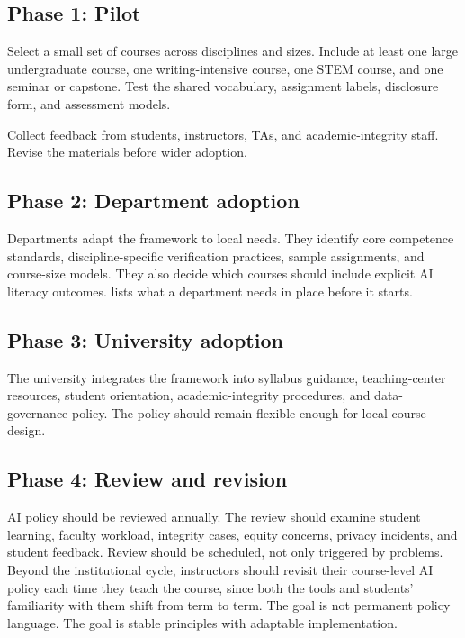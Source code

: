 \documentclass{SIAMbook2023}
\begin{document}
\subsection{Phase 1: Pilot}
\label{u:subsec:pilot}

Select a small set of courses across disciplines and sizes. Include at least one large undergraduate course, one writing-intensive course, one STEM course, and one seminar or capstone. Test the shared vocabulary, assignment labels, disclosure form, and assessment models.

Collect feedback from students, instructors, TAs, and academic-integrity staff. Revise the materials before wider adoption.

\subsection{Phase 2: Department adoption}
\label{u:subsec:department-adoption}

Departments adapt the framework to local needs. They identify core competence standards, discipline-specific verification practices, sample assignments, and course-size models. They also decide which courses should include explicit AI literacy outcomes.  lists what a department needs in place before it starts.

\subsection{Phase 3: University adoption}
\label{u:subsec:university-adoption}

The university integrates the framework into syllabus guidance, teaching-center resources, student orientation, academic-integrity procedures, and data-governance policy. The policy should remain flexible enough for local course design.

\subsection{Phase 4: Review and revision}
\label{u:subsec:review-revision}

AI policy should be reviewed annually. The review should examine student learning, faculty workload, integrity cases, equity concerns, privacy incidents, and student feedback. Review should be scheduled, not only triggered by problems. Beyond the institutional cycle, instructors should revisit their course-level AI policy each time they teach the course, since both the tools and students' familiarity with them shift from term to term. The goal is not permanent policy language. The goal is stable principles with adaptable implementation.
\end{document}
